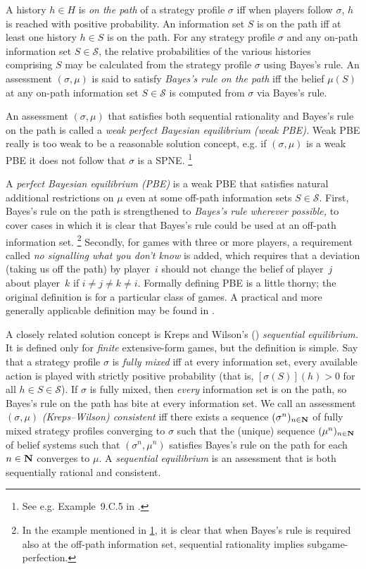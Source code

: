 \documentclass[11pt,letterpaper,reqno,oneside]{book}
\begin{document}
A history $h \in H$ is \emph{on the path} of a strategy profile $\sigma$ iff when players follow $\sigma$, $h$ is reached with positive probability. An information set $S$ is on the path iff at least one history $h \in S$ is on the path. For any strategy profile $\sigma$ and any on-path information set $S \in \mathcal{S}$, the relative probabilities of the various histories comprising $S$ may be calculated from the strategy profile $\sigma$ using Bayes's rule. An assessment $(\sigma,\mu)$ is said to satisfy \emph{Bayes's rule on the path} iff the belief $\mu(S)$ at any on-path information set $S \in \mathcal{S}$ is computed from $\sigma$ via Bayes's rule.

An assessment $(\sigma,\mu)$ that satisfies both sequential rationality and Bayes's rule on the path is called a \emph{weak perfect Bayesian equilibrium (weak PBE).} Weak PBE really is too weak to be a reasonable solution concept, e.g. if $(\sigma,\mu)$ is a weak PBE it does not follow that $\sigma$ is a SPNE.%
	\footnote{\label{footnote:wpbe_spne}See e.g. Example~9.C.5 in \textcite[][p.~289]{MascolellWhinstonGreen1995}.}

A \emph{perfect Bayesian equilibrium (PBE)} is a weak PBE that satisfies natural additional restrictions on $\mu$ even at some off-path information sets $S \in \mathcal{S}$. First, Bayes's rule on the path is strengthened to \emph{Bayes's rule wherever possible,} to cover cases in which it is clear that Bayes's rule could be used at an off-path information set.%
	\footnote{In the example mentioned in \cref{footnote:wpbe_spne}, it is clear that when Bayes's rule is required also at the off-path information set, sequential rationality implies subgame-perfection.}
Secondly, for games with three or more players, a requirement called \emph{no signalling what you don't know} is added, which requires that a deviation (taking us off the path) by player~$i$ should not change the belief of player~$j$ about player~$k$ if $i \neq j \neq k \neq i$.
Formally defining PBE is a little thorny; the original definition \parencite{FudenbergTirole1991} is for a particular class of games. A practical and more generally applicable definition may be found in \textcite{Watson2017}.

A closely related solution concept is Kreps and Wilson's (\citeyear{KrepsWilson1982}) \emph{sequential equilibrium.} It is defined only for \emph{finite} extensive-form games, but the definition is simple. Say that a strategy profile $\sigma$ is \emph{fully mixed} iff at every information set, every available action is played with strictly positive probability (that is, $[\sigma(S)](h) > 0$ for all $h \in S \in \mathcal{S}$). If $\sigma$ is fully mixed, then \emph{every} information set is on the path, so Bayes's rule on the path has bite at every information set. We call an assessment $(\sigma,\mu)$ \emph{(Kreps--Wilson) consistent} iff there exists a sequence $(\sigma^n)_{n \in \mathbf{N}}$ of fully mixed strategy profiles converging to $\sigma$ such that the (unique) sequence $(\mu^n)_{n \in \mathbf{N}}$ of belief systems such that $(\sigma^n,\mu^n)$ satisfies Bayes's rule on the path for each $n \in \mathbf{N}$ converges to $\mu$. A \emph{sequential equilibrium} is an assessment that is both sequentially rational and consistent.
\end{document}
